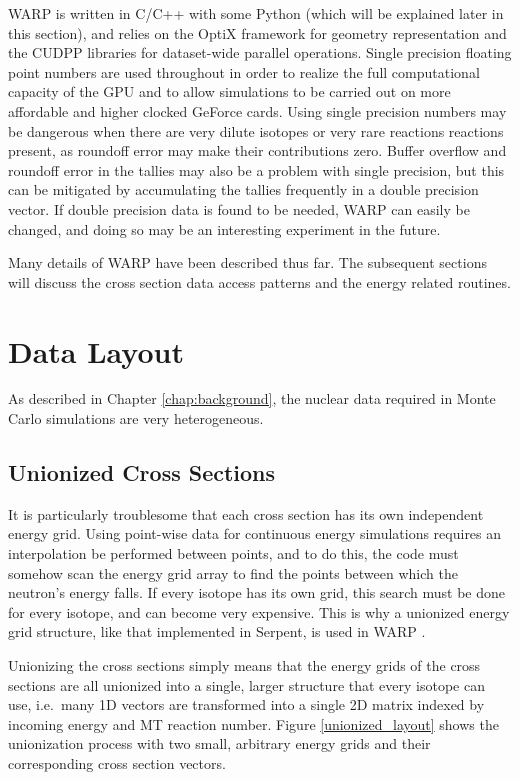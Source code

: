 WARP is written in C/C++ with some Python (which will be explained later in this section), and relies on the OptiX framework for geometry representation and the CUDPP libraries for dataset-wide parallel operations. Single precision floating point numbers are used throughout in order to realize the full computational capacity of the GPU and to allow simulations to be carried out on more affordable and higher clocked GeForce cards.  Using single precision numbers may be dangerous when there are very dilute isotopes or very rare reactions reactions present, as roundoff error may make their contributions zero. %
 Buffer overflow and roundoff error in the tallies may also be a problem with single precision, but this can be mitigated by accumulating the tallies frequently in a double precision vector.  If double precision data is found to be needed, WARP can easily be changed, and doing so may be an interesting experiment in the future.

Many details of WARP have been described thus far. The subsequent sections will discuss the cross section data access patterns and the energy related routines.


\section{Data Layout}

As described in Chapter \ref{chap:background}, the nuclear data required in Monte Carlo simulations are very heterogeneous.

\subsection{Unionized Cross Sections}

It is particularly troublesome that each cross section has its own independent energy grid.  Using point-wise data for continuous energy simulations requires an interpolation be performed between points, and to do this, the code must somehow scan the energy grid array to find the points between which the neutron's energy falls.  If every isotope has its own grid, this search must be done for every isotope, and can become very expensive.  This is why a unionized energy grid structure, like that implemented in Serpent, is used in WARP \cite{jaakko_xs}.

Unionizing the cross sections simply means that the energy grids of the cross sections are all unionized into a single, larger structure that every isotope can use, i.e.\ many 1D vectors are transformed into a single 2D matrix indexed by incoming energy and MT reaction number. %
 Figure \ref{unionized_layout} shows the unionization process with two small, arbitrary energy grids and their corresponding cross section vectors.  

